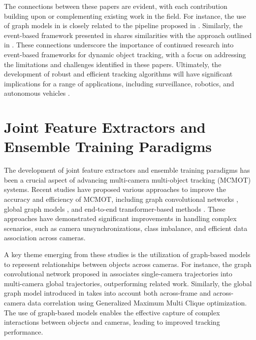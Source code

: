\documentclass[conference]{IEEEtran}
\begin{document}
The connections between these papers are evident, with each contribution building upon or complementing existing work in the field. For instance, the use of graph models in \cite{An equalised global graphical model-based approach for multi-camera object tracking} is closely related to the pipeline proposed in \cite{Multi-camera Multi-Object Tracking}. Similarly, the event-based framework presented in \cite{e-TLD: Event-based Framework for Dynamic Object Tracking} shares similarities with the approach outlined in \cite{Tracking 6-DoF Object Motion from Events and Frames}. These connections underscore the importance of continued research into event-based frameworks for dynamic object tracking, with a focus on addressing the limitations and challenges identified in these papers. Ultimately, the development of robust and efficient tracking algorithms will have significant implications for a range of applications, including surveillance, robotics, and autonomous vehicles \cite{MCTR: Multi-Camera Tracking Transformer}.

\section{Joint Feature Extractors and Ensemble Training Paradigms}
The development of joint feature extractors and ensemble training paradigms has been a crucial aspect of advancing multi-camera multi-object tracking (MCMOT) systems. Recent studies have proposed various approaches to improve the accuracy and efficiency of MCMOT, including graph convolutional networks \cite{Graph Convolutional Network for Multi-Target Multi-Camera Vehicle Tracking}, global graph models \cite{Multi-camera Multi-Object Tracking}, and end-to-end transformer-based methods \cite{MCTR: Multi Camera Tracking Transformer}. These approaches have demonstrated significant improvements in handling complex scenarios, such as camera unsynchronizations, class imbalance, and efficient data association across cameras.

A key theme emerging from these studies is the utilization of graph-based models to represent relationships between objects across cameras. For instance, the graph convolutional network proposed in \cite{Graph Convolutional Network for Multi-Target Multi-Camera Vehicle Tracking} associates single-camera trajectories into multi-camera global trajectories, outperforming related work. Similarly, the global graph model introduced in \cite{Multi-camera Multi-Object Tracking} takes into account both across-frame and across-camera data correlation using Generalized Maximum Multi Clique optimization. The use of graph-based models enables the effective capture of complex interactions between objects and cameras, leading to improved tracking performance.
\end{document}
